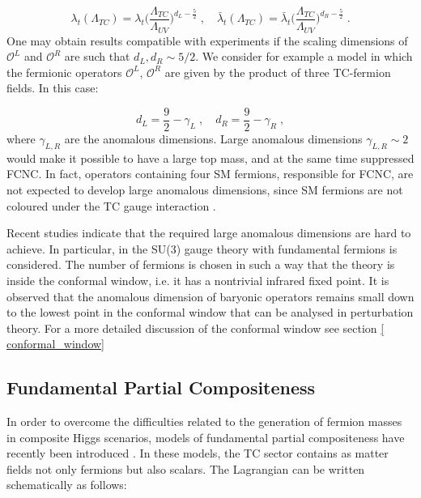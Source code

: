 \begin{equation}
\lambda_t (\Lambda_{TC}) =  \lambda_t \biggl( \frac{\Lambda_{TC}}{\Lambda_{UV}} \biggr)^{d_L - \frac{5}{2}} \; , \quad \bar \lambda_t (\Lambda_{TC}) =  \bar \lambda_t \biggl( \frac{\Lambda_{TC}}{\Lambda_{UV}} \biggr)^{d_R - \frac{5}{2}} \; .
\end{equation}
%
One may obtain results compatible with experiments if the scaling dimensions of $\mathcal O^L$ and $\mathcal O^R$ are such that $d_L , d_R \sim 5/2$. We consider for example a model in which the fermionic operators $\mathcal O^L$, $\mathcal O^R$ are given by the product of three TC-fermion fields. In this case:

\begin{equation}
d_L = \frac{9}{2} - \gamma_L \; , \quad d_R = \frac{9}{2} - \gamma_R   \; ,
\end{equation}
%
where $\gamma_{L,R}$ are the anomalous dimensions. Large anomalous dimensions $\gamma_{L,R} \sim 2$ would make it possible to have a large top mass, and at the same time suppressed FCNC. In fact, operators containing four SM fermions, responsible for FCNC, are not expected to develop large anomalous dimensions, since SM fermions are not coloured under the  TC gauge interaction \cite{Kaplan:1991dc}. 

Recent studies indicate that the required large anomalous dimensions are hard to achieve. In particular, in \cite{Pica:2016rmv} the SU(3) gauge theory with fundamental fermions is considered. The number of fermions is chosen in such a way that the theory is inside the conformal window, i.e. it has a nontrivial infrared fixed point. It is observed that the anomalous dimension of baryonic operators remains small down to the lowest point in the conformal window that can be analysed in perturbation theory. For a more detailed discussion of the conformal window see section \ref{ conformal_window}


\subsection{Fundamental Partial Compositeness}
\label{fundamental_partial_compositeness}

In order to overcome the difficulties related to the generation of fermion masses in composite Higgs scenarios, models of fundamental partial compositeness have recently been introduced \cite{Sannino:2016sfx}. In these models, the TC sector contains as matter fields not only fermions but also scalars. The Lagrangian can be written schematically as follows:

